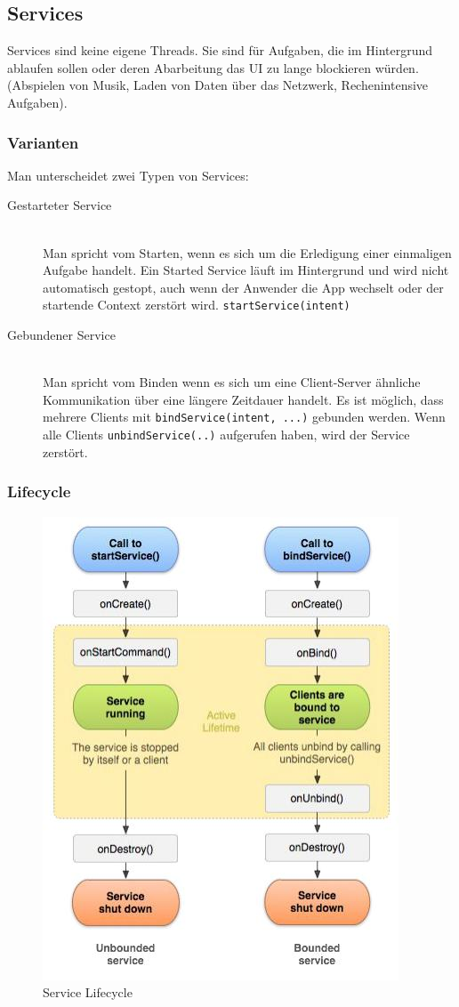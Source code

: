 \subsection{Services}
Services sind keine eigene Threads. Sie sind für Aufgaben, die im Hintergrund ablaufen sollen oder deren Abarbeitung das UI zu lange blockieren würden. (Abspielen von Musik, Laden von Daten über das Netzwerk, Rechenintensive Aufgaben). 
\subsubsection{Varianten}
Man unterscheidet zwei Typen von Services:
\begin{description}
	\item[Gestarteter Service] \hfill \\
	 Man spricht vom Starten, wenn es sich um die Erledigung einer einmaligen Aufgabe handelt. Ein Started Service läuft im Hintergrund und wird nicht automatisch gestopt, auch wenn der Anwender die App wechselt oder der startende Context zerstört wird. \lstinline|startService(intent)|
	\item[Gebundener Service] \hfill \\
	Man spricht vom Binden wenn es sich um eine Client-Server ähnliche Kommunikation über eine längere Zeitdauer handelt. Es ist möglich, dass mehrere Clients mit \lstinline|bindService(intent, ...)| gebunden werden. Wenn alle Clients \lstinline|unbindService(..)| aufgerufen haben, wird der Service zerstört.
\end{description}

\subsubsection{Lifecycle}
\begin{figure}[h]
\centering
\includegraphics[width=0.4\linewidth]{images/service_lifecycle}
\caption{Service Lifecycle}
\label{fig:servicelifecycle}
\end{figure}




